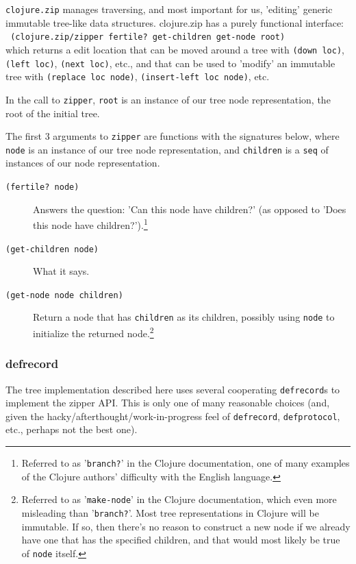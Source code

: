 \documentclass[10pt,openany]{article}
\numberwithin{definition}{section}
\numberwithin{example}{section}
\numberwithin{equation}{section}
\numberwithin{figure}{section}
\begin{document}
\texttt{clojure.zip} manages traversing, and most important for us,
'editing' generic immutable tree-like data structures. clojure.zip
has a purely functional interface:\\
\texttt{ (clojure.zip/zipper~fertile?~get-children~get-node~root)
}\\
which returns a edit location that can be moved around a tree with
\texttt{(down~loc)}, \texttt{(left~loc)}, \texttt{(next~loc)},
etc., and that can be used to 'modify' an immutable tree with \texttt{(replace~loc~node)},
\texttt{(insert-left~loc~node)}, etc.

In the call to \texttt{zipper}, \texttt{root} is an instance of our
tree node representation, the root of the initial tree.

The first 3 arguments to \texttt{zipper} are functions with the signatures
below, where \texttt{node} is an instance of our tree node representation,
and \texttt{children} is a \texttt{seq} of instances of our node representation. 
\begin{description}
\item [{\texttt{(fertile?~node)}}] Answers the question: 'Can this node
have children?' (as opposed to 'Does this node have
children?').\footnote{Referred to as '\texttt{branch?}' in the Clojure 
documentation, one of many examples of the Clojure authors' difficulty
with the  English language.}
\item [{\texttt{(get-children~node)}}] What it says.
\item [{\texttt{(get-node~node~children)}}] Return a node that has \texttt{children}
as its children, possibly using \texttt{node} to initialize the returned
node.\footnote{Referred to as '\texttt{make-node}' in the Clojure documentation,
which even more misleading than '\texttt{branch?}'. Most tree representations
in Clojure will be immutable. If so, then there's no reason to construct
a new node if we already have one that has the specified children,
and that would most likely be true of \texttt{node} itself.} 
\end{description}

\subsubsection{defrecord}

The tree implementation described here uses several cooperating \texttt{defrecord}s
to implement the zipper API. This is only one of many reasonable choices
(and, given the hacky/afterthought/work-in-progress feel of \texttt{defrecord},
\texttt{defprotocol}, etc., perhaps not the best one).
\end{document}
